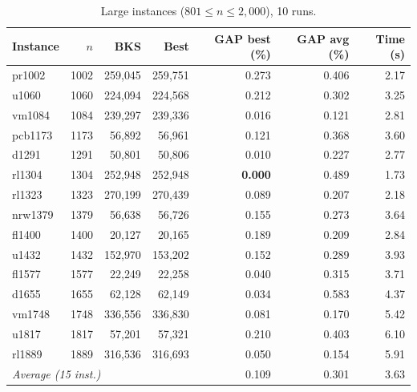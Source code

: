 \documentclass[runningheads]{llncs}
\begin{document}
\begin{table}
\caption{Large instances ($801\le n\le 2{,}000$), 10 runs.}
\label{tab:large}
\centering\scriptsize
\begin{tabular}{@{}lrrrrrr@{}}
\toprule
\textbf{Instance} & $n$ & \textbf{BKS} & \textbf{Best} & \textbf{GAP best (\%)} & \textbf{GAP avg (\%)} & \textbf{Time (s)}\\
\midrule
pr1002 & 1002 & 259{,}045 & 259{,}751 & 0.273 & 0.406 & 2.17 \\
u1060 & 1060 & 224{,}094 & 224{,}568 & 0.212 & 0.302 & 3.25 \\
vm1084 & 1084 & 239{,}297 & 239{,}336 & 0.016 & 0.121 & 2.81 \\
pcb1173 & 1173 & 56{,}892 & 56{,}961 & 0.121 & 0.368 & 3.60 \\
d1291 & 1291 & 50{,}801 & 50{,}806 & 0.010 & 0.227 & 2.77 \\
rl1304 & 1304 & 252{,}948 & 252{,}948 & \textbf{0.000} & 0.489 & 1.73 \\
rl1323 & 1323 & 270{,}199 & 270{,}439 & 0.089 & 0.207 & 2.18 \\
nrw1379 & 1379 & 56{,}638 & 56{,}726 & 0.155 & 0.273 & 3.64 \\
fl1400 & 1400 & 20{,}127 & 20{,}165 & 0.189 & 0.209 & 2.84 \\
u1432 & 1432 & 152{,}970 & 153{,}202 & 0.152 & 0.289 & 3.93 \\
fl1577 & 1577 & 22{,}249 & 22{,}258 & 0.040 & 0.315 & 3.71 \\
d1655 & 1655 & 62{,}128 & 62{,}149 & 0.034 & 0.583 & 4.37 \\
vm1748 & 1748 & 336{,}556 & 336{,}830 & 0.081 & 0.170 & 5.42 \\
u1817 & 1817 & 57{,}201 & 57{,}321 & 0.210 & 0.403 & 6.10 \\
rl1889 & 1889 & 316{,}536 & 316{,}693 & 0.050 & 0.154 & 5.91 \\
\midrule
\multicolumn{4}{l}{\textit{Average (15 inst.)}} & 0.109 & 0.301 & 3.63 \\
\bottomrule
\end{tabular}
\end{table}
\end{document}
